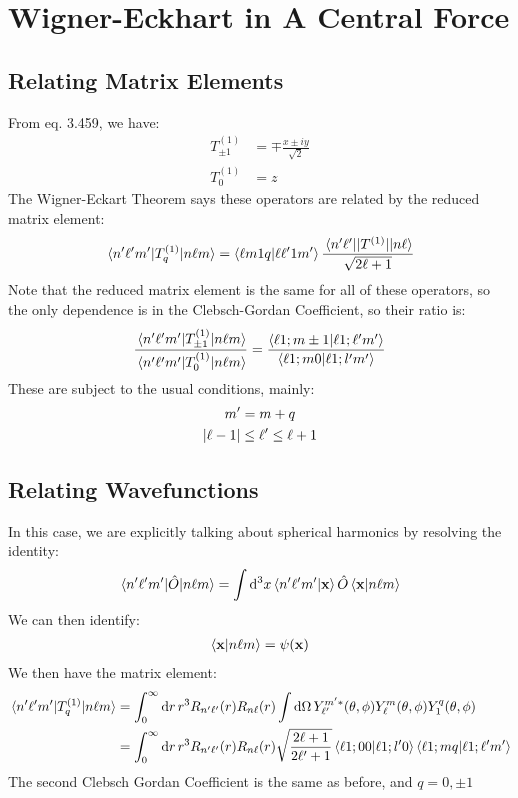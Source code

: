 \documentclass[12pt]{article}
\renewcommand{\l}{\ell}
\begin{document}
\section{Wigner-Eckhart in A Central Force}
\subsection{Relating Matrix Elements}
From eq. 3.459, we have:
\begin{align*}
  T^{(1)}_{\pm1}&=\mp\frac{x\pm iy}{\sqrt{2}}\\
  T^{(1)}_{0}&=z
\end{align*}
The Wigner-Eckart Theorem says these operators are related by the reduced matrix element:
\begin{align*}
  \mel{n'\l'm'}{T^{(1)}_q}{n\l m}=\ip{\l m 1 q}{\l \l' 1m'}
  \frac{\mel{n'\l'}{|T^{(1)}|}{n\l}}{\sqrt{2\l+1}}
\end{align*}
Note that the reduced matrix element is the same for all of these operators, so the only dependence is in the Clebsch-Gordan Coefficient, so their ratio is:
\begin{align*}
  \frac{\mel{n'\l'm'}{T^{(1)}_{\pm1}}{n\l m}}{\mel{n'\l'm'}{T^{(1)}_0}{n\l m}}
  =\frac{\ip{\l1;m \pm1}{\l1;\l'm'}}{\ip{\l1;m 0}{\l1;l'm'}}
\end{align*}
These are subject to the usual conditions, mainly:
\begin{gather*}
  m'=m+q\\
  \abs{\l-1}\leq\l'\leq\l+1
\end{gather*}
\subsection{Relating Wavefunctions}
In this case, we are explicitly talking about spherical harmonics by resolving the identity:
\begin{align*}
  \mel{n'\l'm'}{\hat{O}}{n\l m}=\int\dd[3]{x}\ip{n'\l'm'}{\vb{x}}\hat{O}
  \ip{\vb{x}}{n\l m}
\end{align*}
We can then identify:
\begin{align*}
  \ip{\vb{x}}{n\l m}=\psi(\vb{x})
\end{align*}
We then have the matrix element:
\begin{align*}
  \mel{n'\l'm'}{T^{(1)}_q}{n\l m}&=\int_0^\infty\dd{r} r^3R_{n'\l'}(r)R_{n\l}(r)
  \int\dd{\Omega}Y_{\l'}^{m'*}(\theta,\phi)Y_\ell^m(\theta,\phi)
  Y_1^q(\theta,\phi)\\
  &=\int_0^\infty\dd{r} r^3R_{n'\l'}(r)R_{n\l}(r)
  \sqrt{\frac{2\l+1}{2\l'+1}}\ip{\l1;00}{\l1;l'0}\ip{\l1;mq}{\l1;\l'm'}
\end{align*}
The second Clebsch Gordan Coefficient is the same as before, and $q=0,\pm1$
\end{document}

